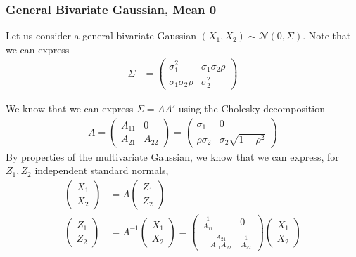 \documentclass[11pt]{article}
\begin{document}
\subsubsection{General Bivariate Gaussian, Mean 0}\label{subsec:gen_gaussian}

Let us consider a general bivariate Gaussian $(X_1, X_2) \sim \mathcal{N}(0, \Sigma)$. Note that we can express
\begin{align*}
\Sigma &= \left( \begin{array}{cc}
\sigma_1^2 & \sigma_1 \sigma_2 \rho \\
\sigma_1 \sigma_2 \rho & \sigma_2^2 \end{array} \right)
\end{align*}

We know that we can express $\Sigma = AA'$ using the Cholesky decomposition
\begin{align*}
A = \left( \begin{array}{cc}
A_{11}&0  \\
A_{21} &A_{22} \end{array} \right) = \left( \begin{array}{cc}
\sigma_1 &0  \\
\rho \sigma_2 & \sigma_2\sqrt{1-\rho^2} \end{array} \right)
\end{align*}
By properties of the multivariate Gaussian, we know that we can express, for $Z_1, Z_2$
independent standard normals,
\begin{align*}
\left( \begin{array}{c}
X_1 \\
X_2 \end{array} \right) &= A \left( \begin{array}{c}
Z_1 \\
Z_2 \end{array} \right) \\
\left( \begin{array}{c}
Z_1 \\
Z_2 \end{array} \right) &= A^{-1} \left( \begin{array}{c}
X_1 \\
X_2 \end{array} \right) =  \left( \begin{array}{cc}
\frac{1}{A_{11}}&0  \\
-\frac{A_{21}}{A_{11} A_{22}} &\frac{1}{A_{22}} \end{array} \right)\left( \begin{array}{c}
X_1 \\
X_2 \end{array} \right)
\end{align*}
\end{document}
